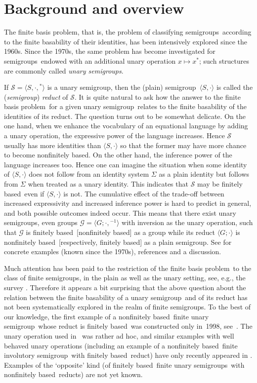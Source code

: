 \documentclass[smallextended]{svjour3}
\newcommand{\sgp}{semi\-group}
\newcommand{\sgps}{semi\-groups}
\newcommand{\fis}{finite involutory semi\-group}
\newcommand{\fss}{finite \sgps}
\newcommand{\fus}{finite unary \sgp}
\newcommand{\fuss}{finite unary \sgps}
\newcommand{\fb}{finitely based}
\newcommand{\fbp}{finite basis problem}
\newcommand{\nfb}{non\-finitely based}
\begin{document}
\section{Background and overview}

The \fbp, that is, the problem of classifying \sgps\ according to the finite basability of their identities, has been intensively explored
since the 1960s. Since the 1970s, the same problem has become investigated for \sgps\ endowed with an additional unary operation $x\mapsto
x^*$; such structures are commonly called \emph{unary \sgps}.

If $\mathcal{S}=\langle S,\cdot,{}^*\rangle$ is a unary \sgp, then the (plain) \sgp\ $\langle S,\cdot\rangle$ is called the (\emph{\sgp})
\emph{reduct} of $\mathcal{S}$. It is quite natural to ask how the answer to the \fbp\ for a given unary \sgp\ relates to the finite
basability of the identities of its reduct. The question turns out to be somewhat delicate. On the one hand, when we enhance the vocabulary
of an equational language by adding a unary operation, the expressive power of the language increases. Hence $\mathcal{S}$ usually has more
identities than $\langle S,\cdot\rangle$ so that the former may have more chance to become \nfb. On the other hand, the inference power of
the language increases too. Hence one can imagine the situation when some identity of $\langle S,\cdot\rangle$  does not follow from an
identity system $\Sigma$ as a plain identity but follows from $\Sigma$ when treated as a unary identity. This indicates that $\mathcal{S}$
may be \fb\ even if $\langle S,\cdot\rangle$ is not. The cumulative effect of the trade-off between increased expressivity and increased
inference power is hard to predict in general, and both possible outcomes indeed occur. This means that there exist unary \sgps, even
groups $\mathcal{G}=\langle G;\cdot,{}^{-1}\rangle$ with inversion as the unary operation, such that $\mathcal{G}$ is \fb\ [\nfb] as a
group while its reduct $\langle G;\cdot\rangle$ is \nfb\ [respectively, \fb] as a plain \sgp. See \cite[Section~2]{Volkov:2001} for
concrete examples (known since the 1970s), references and a discussion.

Much attention has been paid to the restriction of the \fbp\ to the class of \fss, in the plain as well as the unary setting, see, e.g.,
the survey \cite{Volkov:2001}. Therefore it appears a bit surprising that the above question about the relation between the finite
basability of a unary \sgp\ and of its reduct has not been systematically explored in the realm of \fss. To the best of our knowledge, the
first example of a \nfb\ \fus\ whose reduct is \fb\ was constructed only in~1998, see~\cite{Lawrence&Willard:1998}. The unary operation
used in~\cite{Lawrence&Willard:1998} was rather ad hoc, and similar examples with well behaved unary operations (including an example of a
\nfb\ \fis\ with \fb\ reduct) have only recently appeared in \cite{Jackson&Volkov:2010}. Examples of the `opposite' kind (of \fb\ \fuss\
with \nfb\ reducts) are not yet known.
\end{document}
